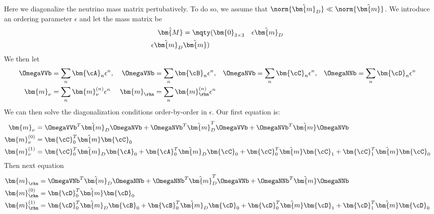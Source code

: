 Here we diagonalize the neutrino mass matrix pertubatively. To do so, we assume that \(\norm{\hat{\bm{m}}_{D}} \ll \norm{\hat{\bm{m}}}\).
We introduce an ordering parameter \(\epsilon\) and let the mass matrix be
\begin{align}
	\hat{\bm{M}}             & = \mqty(
	\bm{0}_{3\times3}        & \epsilon\hat{\bm{m}}_{D} \\
	\epsilon\hat{\bm{m}}_{D} & \hat{\bm{m}}
	)
\end{align}
We then let
\begin{align}
	\OmegaVVb     & = \sum_{n}\bm{\cA}_{n}\epsilon^{n},       &
	\OmegaVNb     & = \sum_{n}\bm{\cB}_{n}\epsilon^{n},       &
	\OmegaNVb     & = \sum_{n}\bm{\cC}_{n}\epsilon^{n},       &
	\OmegaNNb     & = \sum_{n}\bm{\cD}_{n}\epsilon^{n}          \\
	\bm{m}_{\nu}  & = \sum_{n}\bm{m}_{\nu}^{(n)}\epsilon^{n}  &
	\bm{m}_{\rhn} & = \sum_{n}\bm{m}_{\rhn}^{(n)}\epsilon^{n}
\end{align}
We can then solve the diagonalization conditions order-by-order in \(\epsilon\). Our first equation is:
\begin{align}
	\bm{m}_{\nu}
	                   & =
	\OmegaVVb^{T}\hat{\bm{m}}_{D}\OmegaNVb+\OmegaNVb^{T}\hat{\bm{m}}^{T}_{D}\OmegaVVb+\OmegaNVb^{T}\hat{\bm{m}}\OmegaNVb \\
	\bm{m}^{(0)}_{\nu} & = \bm{\cC}_{0}^{T}\hat{\bm{m}}\bm{\cC}_{0}                                                      \\
	\bm{m}^{(1)}_{\nu} & =
	\bm{\cC}_{0}^{T}\hat{\bm{m}}_{D}\bm{\cA}_{0}
	+\bm{\cA}_{0}^{T}\hat{\bm{m}}_{D}\bm{\cC}_{0}
	+\bm{\cC}_{0}^{T}\hat{\bm{m}}\bm{\cC}_{1}
	+\bm{\cC}_{1}^{T}\hat{\bm{m}}\bm{\cC}_{0}
\end{align}
Then next equation
\begin{align}
	\bm{m}_{\rhn}       & =
	\OmegaVNb^{T}\hat{\bm{m}}_{D}\OmegaNNb
	+\OmegaNNb^{T}\hat{\bm{m}}^{T}_{D}\OmegaVNb
	+\OmegaNNb^{T} \hat{\bm{m}}\OmegaNNb                             \\
	\bm{m}^{(0)}_{\rhn} & = \bm{\cD}_{0}^{T}\hat{\bm{m}}\bm{\cD}_{0} \\
	\bm{m}^{(1)}_{\rhn} & =
	\bm{\cD}_{0}^{T}\hat{\bm{m}}_{D}\bm{\cB}_{0}
	+\bm{\cB}_{0}^{T}\hat{\bm{m}}_{D}\bm{\cD}_{0}
	+\bm{\cD}_{0}^{T}\hat{\bm{m}}\bm{\cD}_{1}
	+\bm{\cD}_{1}^{T}\hat{\bm{m}}\bm{\cD}_{0}
\end{align}


